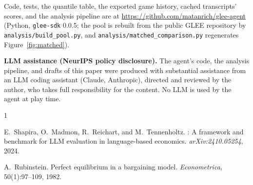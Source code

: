\documentclass{article}
\begin{document}
Code, tests, the quantile table, the exported game history, cached
transcripts' scores, and the analysis pipeline are at
\url{https://github.com/matanrich/glee-agent} (Python, \texttt{glee-sdk}
0.0.5; the pool is rebuilt from the public GLEE repository by
\texttt{analysis/build\_pool.py}, and \texttt{analysis/matched\_comparison.py}
regenerates Figure~\ref{fig:matched}).

\textbf{LLM assistance (NeurIPS policy disclosure).} The agent's code, the
analysis pipeline, and drafts of this paper were produced with substantial
assistance from an LLM coding assistant (Claude, Anthropic), directed and
reviewed by the author, who takes full responsibility for the content. No LLM
is used by the agent at play time.

\begin{thebibliography}{1}

E.~Shapira, O.~Madmon, R.~Reichart, and M.~Tennenholtz.
: A framework and benchmark for {LLM} evaluation in
  language-based economics.
\newblock \emph{arXiv:2410.05254}, 2024.

A.~Rubinstein.
\newblock Perfect equilibrium in a bargaining model.
\newblock \emph{Econometrica}, 50(1):97--109, 1982.

\end{thebibliography}
\end{document}
